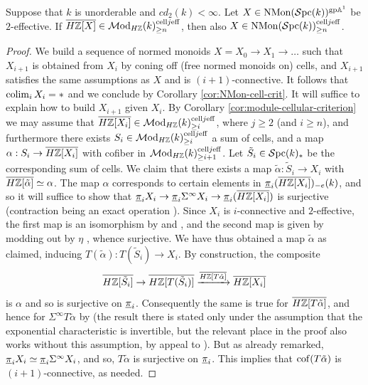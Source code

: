 \documentclass{amsart}
\numberwithin{proposition}{section}
\numberwithin{equation}{section}
\def\cell{\mathrm{cell}}
\def\NMon{\mathrm{NMon}}
\begin{document}
\begin{lemma} \label{lem:cellularity}
Suppose that $k$ is unorderable and $cd_2(k) < \infty$.
Let $X \in \NMon(\Spc(k))^{\gp\A^1}$ be $2$-effective.
If $\overline{H\Z[X]} \in \Mod_{H\Z}(k)^{\cell j \eff}_{\ge n}$, then also $X \in \NMon(\Spc(k))^{\cell j \eff}_{\ge n}$.
\end{lemma}
\begin{proof}
We build a sequence of normed monoids $X=X_0 \to X_1 \to \dots$ such that $X_{i+1}$ is obtained from $X_i$ by coning off (free normed monoids on) cells, and $X_{i+1}$ satisfies the same assumptions as $X$ and is $(i+1)$-connective.
It follows that $\operatorname*{colim}_i X_i = *$ and we conclude by Corollary \ref{cor:NMon-cell-crit}.
It will suffice to explain how to build $X_{i+1}$ given $X_i$.
By Corollary \ref{cor:module-cellular-criterion} we may assume that $\overline{H\Z[X_i]} \in \Mod_{H\Z}(k)^{\cell j \eff}_{\ge i}$, where $j \ge 2$ (and $i \ge n$), and furthermore there exists $S_i \in \Mod_{H\Z}(k)^{\cell j \eff}_{\ge i}$ a sum of cells, and a map $\alpha: S_i \to \overline{H\mathbb{Z}[X_i]}$ with cofiber in $\Mod_{H\Z}(k)^{\cell j \eff}_{\ge i+1}$.
Let $\tilde S_i \in \mathcal{S}\mathrm{pc}{}(k)_*$ be the corresponding sum of cells.
We claim that there exists a map $\tilde \alpha: \tilde S_i \to X_i$ with $\overline{H\mathbb{Z}[\tilde\alpha]} \simeq \alpha$.
The map $\alpha$ corresponds to certain elements in $\underline\pi_i(\overline{H\mathbb{Z}[X_i]})_{-e}(k)$, and so it will suffice to show that $\underline\pi_i X_i \to \underline\pi_i \Sigma^\infty X_i \to \underline\pi_i(\overline{H\mathbb{Z}[X_i]})$ is surjective (contraction being an exact operation \cite[Proposition~3.1.18(3)]{AFHLocalization}).
Since $X_i$ is $i$-connective and $2$-effective, the first map is an isomorphism by \cite[Theorems~6.37 and 6.61]{A1-alg-top} and \cite[Theorem~2.2.30(1)]{freudenthal}, and the second map is given by modding out by $\eta$ \cite[Theorem~12]{bachmann-hurewicz}, whence surjective.
We have thus obtained a map $\tilde\alpha$ as claimed, inducing $T(\tilde \alpha): T(\tilde S_i) \to X_i$.
By construction, the composite \[ \overline{H\mathbb{Z}[\tilde S_i]} \to \overline{H\mathbb{Z}[T(\tilde S_i)]} \xrightarrow{\overline{H\mathbb{Z}[T\tilde \alpha]}} \overline{H\mathbb{Z}[X_i]} \] is $\alpha$ and so is surjective on $\underline\pi_i$.
Consequently the same is true for $\overline{H\mathbb{Z}[T\tilde \alpha]}$, and hence for $\Sigma^\infty T\tilde \alpha$ by \cite[Theorem 16]{bachmann-hurewicz} (the result there is stated only under the assumption that the exponential characteristic is invertible, but the relevant place in the proof also works without this assumption, by appeal to \cite[Proposition D.1]{bachmann-resolution}).
But as already remarked, $\underline\pi_i X_i \simeq \underline\pi_i \Sigma^\infty X_i$, and so, $T\tilde \alpha$ is surjective on $\underline\pi_i$.
This implies that $\operatorname{cof}(T\tilde \alpha)$ is $(i+1)$-connective, as needed.
\end{proof}
\end{document}
